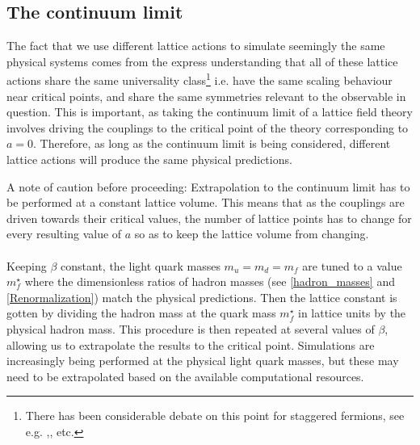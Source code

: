 \documentclass[a4paper,10pt]{book}
\begin{document}
\subsection{The continuum limit}
The fact that we use different lattice actions to simulate seemingly the same physical systems comes from the express understanding that all of these lattice actions share the same universality class\footnote{There has been considerable debate on this point for staggered fermions, see e.g. \cite{BERNARD2007235},\cite{golterman2008qcd},\cite{Creutz2007ReplyT} etc.} i.e. have the same scaling behaviour near critical points, and share the same symmetries relevant to the observable in question. This is important, as taking the continuum limit of a lattice field theory involves driving the couplings to the critical point of the theory corresponding to $a=0$. Therefore, as long as the continuum limit is being considered, different lattice actions will produce the same physical predictions.\par A note of caution before proceeding: Extrapolation to the continuum limit has to be performed at a constant lattice volume. This means that as the couplings are driven towards their critical values, the number of lattice points has to change for every resulting value of $a$ so as to keep the lattice volume from changing.\\\\Keeping $\beta$ constant, the light quark masses $m_u=m_d=m_f$ are tuned to a value $m_f^\star$ where the dimensionless ratios of hadron masses (see \ref{hadron_masses} and \ref{Renormalization}) match the physical predictions. Then the lattice constant is gotten by dividing the hadron mass at the quark mass $m_f^\star$ in lattice units by the physical hadron mass. This procedure is then repeated at several values of $\beta$, allowing us to extrapolate the results to the critical point. Simulations are increasingly being performed at the physical light quark masses, but these may need to be extrapolated based on the available computational resources.
\end{document}
